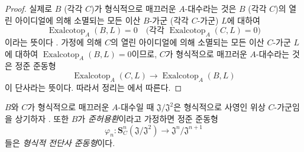 \begin{proof}
실제로 $B$ (각각 $C$)가 형식적으로 매끄러운 $A$-대수라는 것은
$B$ (각각 $C$)의 열린 아이디얼에 의해 소멸되는 모든 이산
$B$-가군 (각각 $C$-가군) $L$에 대하여
\[
  \operatorname{Exalcotop}_A(B,L)=0
  \quad\text{(각각 }\operatorname{Exalcotop}_A(C,L)=0\text{)}
\]
이라는 뜻이다 . 가정에 의해 $C$의 열린 아이디얼에
의해 소멸되는 모든 이산 $C$-가군 $L$에 대하여
$\operatorname{Exalcotop}_A(B,L)=0$이므로, $C$가 형식적으로 매끄러운
$A$-대수라는 것은 정준 준동형
\[
  \operatorname{Exalcotop}_A(C,L)\longrightarrow
  \operatorname{Exalcotop}_A(B,L)
\]
이 단사라는 뜻이다. 따라서 정리는 에서 따른다.
\end{proof}

$B$와 $C$가 형식적으로 매끄러운 $A$-대수일 때
$\mathfrak J/\mathfrak J^2$은 형식적으로 사영인 위상 $C$-가군임을
상기하자 . 또한 $B$가 \emph{준허용환}이라고
가정하면 정준 준동형
\[
  \varphi_n:\mathbf S_C^n(\mathfrak J/\mathfrak J^2)
  \longrightarrow\mathfrak J^n/\mathfrak J^{n+1}
\]
들은 \emph{형식적 전단사 준동형}이다.

